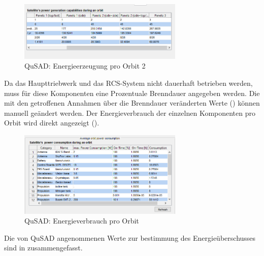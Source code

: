 			\begin{figure}[!h]
				\centering
					\includegraphics[width=0.70\textwidth]{graphics/power4.PNG}
				\caption{QuSAD: Energieerzeugung pro Orbit 2}
				\label{fig:power4}
			\end{figure}
Da das Haupttriebwerk und das RCS-System nicht dauerhaft betrieben werden, muss für diese Komponenten eine Prozentuale Brenndauer angegeben werden. Die mit den getroffenen Annahmen über die Brenndauer veränderten Werte  () können manuell geändert werden. Der Energieverbrauch der einzelnen Komponenten pro Orbit wird direkt angezeigt ().\\
			
			\begin{figure}[!h]
				\centering
					\includegraphics[width=0.70\textwidth]{graphics/power5.png}
				\caption{QuSAD: Energieverbrauch pro Orbit}
				\label{fig:power5}
			\end{figure}
Die von QuSAD angenommenen Werte zur bestimmung des Energieüberschusses sind in   zusammengefasst.\\ 
			
